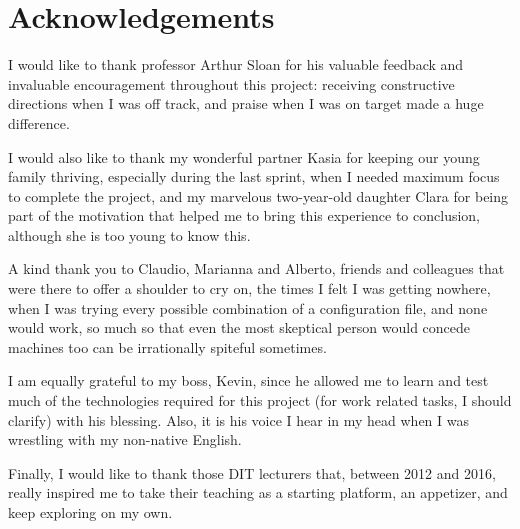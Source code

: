 \chapter{Acknowledgements}
I would like to thank professor Arthur Sloan for his valuable feedback and
invaluable encouragement throughout this project: receiving constructive
directions when I was off track, and praise when I was on target made a huge
difference.

I would also like to thank my wonderful partner Kasia for keeping our young
family thriving, especially during the last sprint, when I needed maximum focus
to complete the project, and my marvelous two-year-old daughter Clara for being
part of the motivation that helped me to bring this experience to conclusion,
although she is too young to know this.

A kind thank you to Claudio, Marianna and Alberto, friends and colleagues that
were there to offer a shoulder to cry on, the times I felt I was getting
nowhere, when I was trying every possible combination of a configuration file,
and none would work, so much so that even the most skeptical person would
concede machines too can be irrationally spiteful sometimes.

I am equally grateful to my boss, Kevin, since he allowed me to learn and
test much of the technologies required for this project (for work related tasks,
I should clarify) with his blessing. Also, it is his voice I hear in my head
when I was wrestling with my non-native English.

Finally, I would like to thank those DIT lecturers that, between 2012 and 2016,
really inspired me to take their teaching as a starting platform, an appetizer,
and keep exploring on my own.
